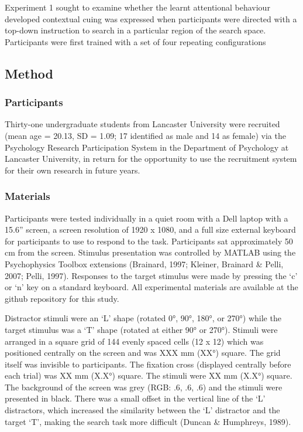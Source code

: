 \documentclass[
  man]{apa6}
\begin{document}
Experiment 1 sought to examine whether the learnt attentional behaviour developed contextual cuing was expressed when participants were directed with a top-down instruction to search in a particular region of the search space. Participants were first trained with a set of four repeating configurations

\hypertarget{method}{%
\subsection{Method}\label{method}}

\hypertarget{participants}{%
\subsubsection{Participants}\label{participants}}

Thirty-one undergraduate students from Lancaster University were recruited (mean age = 20.13, SD = 1.09; 17 identified as male and 14 as female) via the Psychology Research Participation System in the Department of Psychology at Lancaster University, in return for the opportunity to use the recruitment system for their own research in future years.

\hypertarget{materials}{%
\subsubsection{Materials}\label{materials}}

Participants were tested individually in a quiet room with a Dell laptop with a 15.6'' screen, a screen resolution of 1920 x 1080, and a full size external keyboard for participants to use to respond to the task. Participants sat approximately 50 cm from the screen. Stimulus presentation was controlled by MATLAB using the Psychophysics Toolbox extensions (Brainard, 1997; Kleiner, Brainard \& Pelli, 2007; Pelli, 1997). Responses to the target stimulus were made by pressing the `c' or `n' key on a standard keyboard. All experimental materials are available at the github repository for this study.

Distractor stimuli were an `L' shape (rotated 0°, 90°, 180°, or 270°) while the target stimulus was a `T' shape (rotated at either 90° or 270°). Stimuli were arranged in a square grid of 144 evenly spaced cells (12 x 12) which was positioned centrally on the screen and was XXX mm (XX°) square. The grid itself was invisible to participants. The fixation cross (displayed centrally before each trial) was XX mm (X.X°) square. The stimuli were XX mm (X.X°) square. The background of the screen was grey (RGB: .6, .6, .6) and the stimuli were presented in black. There was a small offset in the vertical line of the `L' distractors, which increased the similarity between the `L' distractor and the target `T', making the search task more difficult (Duncan \& Humphreys, 1989).
\end{document}
